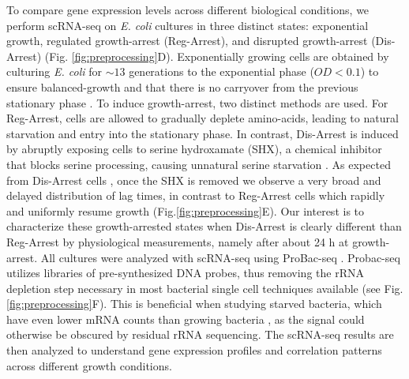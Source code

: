 \documentclass[12pt]{article}
\begin{document}
To compare gene expression levels across different biological conditions, we perform scRNA-seq on \textit{E. coli} cultures in three distinct states: exponential growth, regulated growth-arrest (Reg-Arrest), and disrupted growth-arrest (Dis-Arrest) (Fig. \ref{fig:preprocessing}D). Exponentially growing cells are obtained by culturing \textit{E. coli} for $\sim13$ generations to the exponential phase ($OD<0.1$) to ensure balanced-growth and that there is no carryover from the previous stationary phase \cite{Balaban2019}. To induce growth-arrest, two distinct methods are used. For Reg-Arrest, cells are allowed to gradually deplete amino-acids, leading to natural starvation and entry into the stationary phase. In contrast, Dis-Arrest is induced by abruptly exposing cells to serine hydroxamate (SHX), a chemical inhibitor that blocks serine processing, causing unnatural serine starvation \cite{Tosa1971,Traxler2008,Durfee2008}. As expected from Dis-Arrest cells \cite{Kaplan2021}, once the SHX is removed we observe a very broad and delayed distribution of lag times, in contrast to Reg-Arrest cells which rapidly and uniformly resume growth (Fig.\ref{fig:preprocessing}E). Our interest is to characterize these growth-arrested states when Dis-Arrest is clearly different than Reg-Arrest by physiological measurements, namely after about 24 h at growth-arrest. All cultures were analyzed with scRNA-seq using ProBac-seq \cite{McNulty2023}. Probac-seq utilizes libraries of pre-synthesized DNA probes, thus removing the rRNA depletion step necessary in most bacterial single cell techniques available (see Fig. \ref{fig:preprocessing}F). This is beneficial when studying starved bacteria, which have even lower mRNA counts than growing bacteria \cite{Rotem2024}, as the signal could otherwise be obscured by residual rRNA sequencing. The scRNA-seq results are then analyzed to understand gene expression profiles and correlation patterns across different growth conditions.\par
\end{document}
